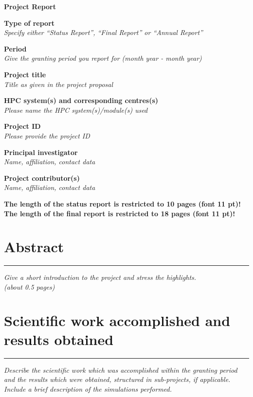\documentclass [a4paper, 11pt]{article}
\begin{document}
\LARGE
\begin{center}
  \bf Project Report\\
\end{center}

\large
\bigskip
\bigskip
\bigskip

\textbf{Type of report}\\
\phantom{MM}\textit{Specify either “Status Report”, “Final Report” or “Annual Report”}

\bigskip
\textbf{Period}\\
\phantom{MM}\textit{Give the granting period you report for (month year - month year)}

\bigskip
\textbf{Project title}\\
\phantom{MM}\textit{Title as given in the project proposal}

\bigskip
\textbf{HPC system(s) and corresponding centres(s)}\\
\phantom{MM} \textit{Please name the HPC system(s)/module(s) used}

\bigskip
\textbf{Project ID}\\
\phantom{MM} \textit{Please provide the project ID}

\bigskip
\textbf{Principal investigator}\\
\phantom{MM} \textit{Name, affiliation, contact data}

\bigskip
\textbf{Project contributor(s)}\\
\phantom{MM} \textit{Name, affiliation, contact data}

\vfill
\begin{center}
\textbf{The length of the status report is restricted to 10 pages (font 11 pt)!}\\
\textbf{The length of the final report is restricted to 18 pages (font 11 pt)!}
\end{center}

\newpage

\vfill
\tableofcontents
\vfill

\newpage

\section{Abstract}\label{sec:abstract}
\rule{\textwidth}{0.4pt}
\textit{Give a short introduction to the project and stress the highlights.}\\

\textit{(about 0.5 pages)}

\section{Scientific work accomplished and results obtained}\label{sec:results}
\rule{\textwidth}{0.4pt}
\textit{Describe the scientific work which was accomplished within the granting period and the results which were obtained, structured in sub-projects, if applicable. Include a brief description of the simulations performed.}
\end{document}
